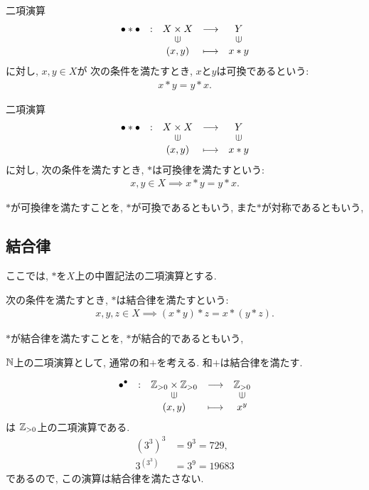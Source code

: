 \begin{definition}
  二項演算
  \begin{align*}
    \shazo{\bullet\ast\bullet}
          {X\times X}{Y}
          {(x,y)}{x\ast y}
  \end{align*}
  に対し,
  $x,y\in X$が
  次の条件を満たすとき,
  $x$と$y$は可換であるという:
  \begin{align*}
    x\ast y=y\ast x.
  \end{align*}
\end{definition}
\begin{definition}
  二項演算
  \begin{align*}
    \shazo{\bullet\ast\bullet}
          {X\times X}{Y}
          {(x,y)}{x\ast y}
  \end{align*}
  に対し,
  次の条件を満たすとき,
  $\ast$は可換律を満たすという:
  \begin{align*}
    x,y\in X\implies x\ast y=y\ast x.
  \end{align*}
\end{definition}
\begin{remark}
  $\ast$が可換律を満たすことを,
  $\ast$が可換であるともいう,
  また$\ast$が対称であるともいう,
\end{remark}


\subsection{結合律}
ここでは,
$\ast$を$X$上の中置記法の二項演算とする.
\begin{definition}
  次の条件を満たすとき,
  $\ast$は結合律を満たすという:
  \begin{align*}
    x,y,z\in X\implies (x\ast y)\ast z = x\ast (y\ast z).
  \end{align*}
\end{definition}
\begin{remark}
  $\ast$が結合律を満たすことを,
  $\ast$が結合的であるともいう,
\end{remark}
\begin{example}
  $\mathbb{N}$上の二項演算として,
  通常の和$+$を考える.
  和$+$は結合律を満たす.
\end{example}
\begin{nonexample}
\begin{align*}
  \shazo{\bullet^\bullet}
        {\ZZ_{>0}\times \ZZ_{>0}}{\ZZ_{>0}}
        {(x,y)}{x^y}
\end{align*}
は
$\mathbb{Z}_{>0}$上の二項演算である.
\begin{align*}
  (3^3)^3&=9^3=729,\\
  3^{(3^3)}&=3^9=19683
\end{align*}
であるので,
この演算は結合律を満たさない.
\end{nonexample}

